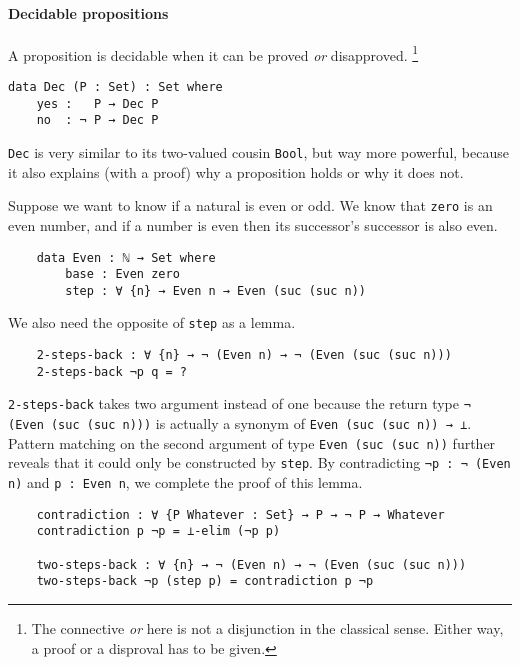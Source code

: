 \documentclass[12pt, a4paper]{article}
\begin{document}
\paragraph{Decidable propositions}

A proposition is decidable when it can be proved \textit{or} disapproved.
\footnote{The connective \textit{or} here is not a disjunction in the classical sense.
Either way, a proof or a disproval has to be given.}

\begin{lstlisting}
data Dec (P : Set) : Set where
    yes :   P → Dec P
    no  : ¬ P → Dec P
\end{lstlisting}

{\lstinline|Dec|} is very similar to its two-valued cousin {\lstinline|Bool|},
but way more powerful, because it also explains (with a proof) why a proposition
holds or why it does not.

Suppose we want to know if a natural is even or odd. We know that {\lstinline|zero|}
is an even number, and if a number is even then its successor's successor is also even.

\begin{lstlisting}
    data Even : ℕ → Set where
        base : Even zero
        step : ∀ {n} → Even n → Even (suc (suc n))
\end{lstlisting}

We also need the opposite of {\lstinline|step|} as a lemma.

\begin{lstlisting}
    2-steps-back : ∀ {n} → ¬ (Even n) → ¬ (Even (suc (suc n)))
    2-steps-back ¬p q = ?
\end{lstlisting}

{\lstinline|2-steps-back|} takes two argument instead of one because the return
type {\lstinline|¬ (Even (suc (suc n)))|} is actually a synonym of
{\lstinline|Even (suc (suc n)) → ⊥|}. Pattern matching on the second argument
of type {\lstinline|Even (suc (suc n))|} further reveals that it could only be
constructed by {\lstinline|step|}.  By contradicting {\lstinline|¬p : ¬ (Even n)|}
and {\lstinline|p : Even n|}, we complete the proof of this lemma.

\begin{lstlisting}
    contradiction : ∀ {P Whatever : Set} → P → ¬ P → Whatever
    contradiction p ¬p = ⊥-elim (¬p p)

    two-steps-back : ∀ {n} → ¬ (Even n) → ¬ (Even (suc (suc n)))
    two-steps-back ¬p (step p) = contradiction p ¬p
\end{lstlisting}
\end{document}

